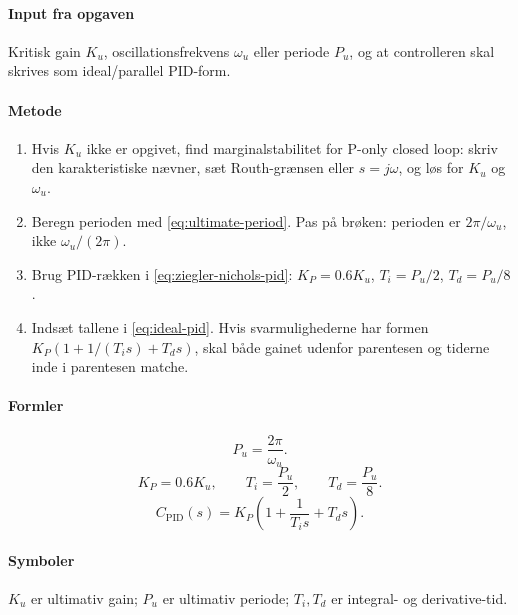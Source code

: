 \paragraph{Input fra opgaven}
Kritisk gain \(K_u\), oscillationsfrekvens \(\omega_u\) eller periode \(P_u\), og at
controlleren skal skrives som ideal/parallel PID-form.

\paragraph{Metode}
\begin{enumerate}
\item Hvis \(K_u\) ikke er opgivet, find marginalstabilitet for P-only closed loop:
      skriv den karakteristiske nævner, sæt Routh-grænsen eller \(s=j\omega\), og løs
      for \(K_u\) og \(\omega_u\).
\item Beregn perioden med \eqref{eq:ultimate-period}. Pas på brøken: perioden er
      \(2\pi/\omega_u\), ikke \(\omega_u/(2\pi)\).
\item Brug PID-rækken i \eqref{eq:ziegler-nichols-pid}: \(K_P=0.6K_u\),
      \(T_i=P_u/2\), \(T_d=P_u/8\).
\item Indsæt tallene i \eqref{eq:ideal-pid}. Hvis svarmulighederne har formen
      \(K_P(1+1/(T_i s)+T_d s)\), skal både gainet udenfor parentesen og tiderne inde i
      parentesen matche.
\end{enumerate}

\paragraph{Formler}
\begin{equation}
\label{eq:ultimate-period}
P_u=\frac{2\pi}{\omega_u}.
\end{equation}
\begin{equation}
\label{eq:ziegler-nichols-pid}
K_P=0.6K_u,\qquad T_i=\frac{P_u}{2},\qquad T_d=\frac{P_u}{8}.
\end{equation}
\begin{equation}
\label{eq:ideal-pid}
C_{\mathrm{PID}}(s)=K_P\left(1+\frac{1}{T_i s}+T_d s\right).
\end{equation}

\paragraph{Symboler}
\(K_u\) er ultimativ gain; \(P_u\) er ultimativ periode; \(T_i,T_d\) er integral- og
derivative-tid.

